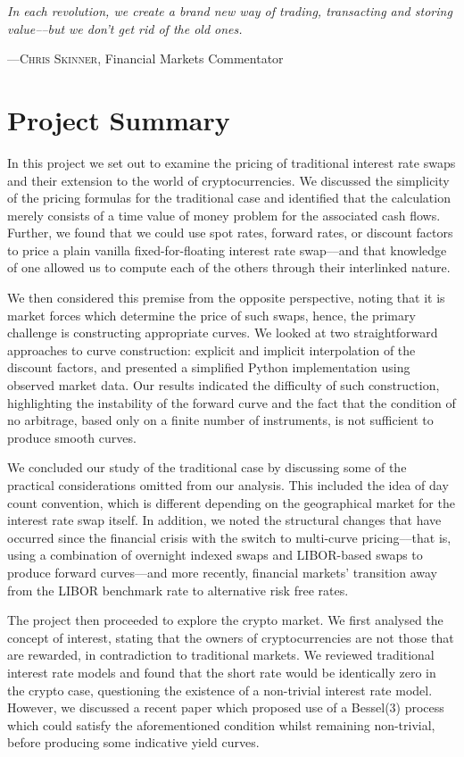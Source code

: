 \epigraph{\textit{In each revolution, we create a brand new way of trading, transacting and storing value––but we don’t get rid of the old ones.}}{––\textsc{Chris Skinner}, Financial Markets Commentator}

\section{Project Summary}
In this project we set out to examine the pricing of traditional interest rate swaps and their extension to the world of cryptocurrencies. We discussed the simplicity of the pricing formulas for the traditional case and identified that the calculation merely consists of a time value of money problem for the associated cash flows. Further, we found that we could use spot rates, forward rates, or discount factors to price a plain vanilla fixed-for-floating interest rate swap––and that knowledge of one allowed us to compute each of the others through their interlinked nature. 

We then considered this premise from the opposite perspective, noting that it is market forces which determine the price of such swaps, hence, the primary challenge is constructing appropriate curves. We looked at two straightforward approaches to curve construction: explicit and implicit interpolation of the discount factors, and presented a simplified Python implementation using observed market data. Our results indicated the difficulty of such construction, highlighting the instability of the forward curve and the fact that the condition of no arbitrage, based only on a finite number of instruments, is not sufficient to produce smooth curves.

We concluded our study of the traditional case by discussing some of the practical considerations omitted from our analysis. This included the idea of day count convention, which is different depending on the geographical market for the interest rate swap itself. In addition, we noted the structural changes that have occurred since the financial crisis with the switch to multi-curve pricing––that is, using a combination of overnight indexed swaps and LIBOR-based swaps to produce forward curves––and more recently, financial markets' transition away from the LIBOR benchmark rate to alternative risk free rates.

The project then proceeded to explore the crypto market. We first analysed the concept of interest, stating that the owners of cryptocurrencies are not those that are rewarded, in contradiction to traditional markets. We reviewed traditional interest rate models and found that the short rate would be identically zero in the crypto case, questioning the existence of a non-trivial interest rate model.  However, we discussed a recent paper which proposed use of a Bessel(3) process which could satisfy the aforementioned condition whilst remaining non-trivial, before producing some indicative yield curves. 

